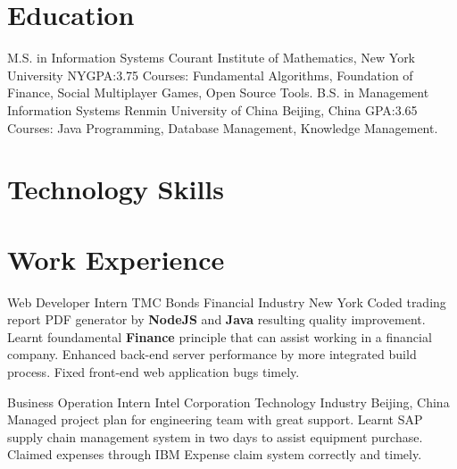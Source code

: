 \documentclass[11pt,a4paper,sans]{moderncv}   %
\begin{document}
\maketitle

\section{Education}
{M.S. in Information Systems}
{Courant Institute of Mathematics, New York University}
{NY}{GPA:3.75}
{Courses: Fundamental Algorithms, Foundation of Finance, Social Multiplayer Games, Open Source Tools.}
{B.S. in Management Information Systems}
{Renmin University of China}
{Beijing, China}
{GPA:3.65}
{Courses: Java Programming, Database Management, Knowledge Management.}

\section{Technology Skills}


\section{Work Experience}
\renewcommand{\baselinestretch}{1.25}

{Web Developer Intern}
{TMC Bonds}
{Financial Industry}
{New York}
{
	{Coded trading report PDF generator by \textbf{NodeJS} and \textbf{Java} resulting quality improvement.}
	\newline
	{Learnt foundamental \textbf{Finance} principle that can assist working in a financial company.}
	\newline
	{Enhanced back-end server performance by more integrated build process.}
	\newline
	{Fixed front-end web application bugs timely.}
}

{Business Operation Intern}
{Intel Corporation}
{Technology Industry}
{Beijing, China}
{
	{Managed project plan for engineering team with great support.}
	\newline
	{Learnt SAP supply chain management system in two days to assist equipment purchase.}
	\newline
	{Claimed expenses through IBM Expense claim system correctly and timely.}
}
\end{document}

